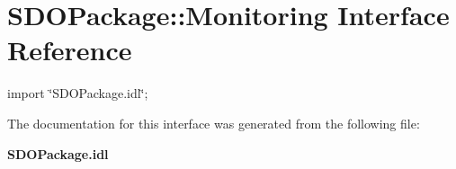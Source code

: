 \section{SDOPackage::Monitoring Interface Reference}
\label{interfaceSDOPackage_1_1Monitoring}


{\ttfamily import \char`\"{}SDOPackage.idl\char`\"{};}



The documentation for this interface was generated from the following file:\begin{DoxyCompactItemize}
\item 
{\bf SDOPackage.idl}\end{DoxyCompactItemize}
